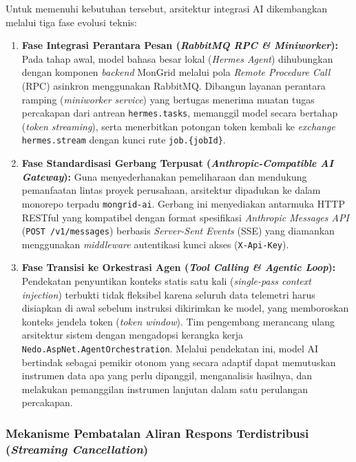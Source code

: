 Untuk memenuhi kebutuhan tersebut, arsitektur integrasi AI dikembangkan melalui tiga fase evolusi teknis:
\begin{enumerate}[label=\arabic*., leftmargin=*, itemsep=0pt]
  \item \textbf{Fase Integrasi Perantara Pesan (\textit{RabbitMQ RPC \& Miniworker}):} Pada tahap awal, model bahasa besar lokal (\textit{Hermes Agent}) dihubungkan dengan komponen \textit{backend} MonGrid melalui pola \textit{Remote Procedure Call} (RPC) asinkron menggunakan RabbitMQ. Dibangun layanan perantara ramping (\textit{miniworker service}) yang bertugas menerima muatan tugas percakapan dari antrean \texttt{hermes.tasks}, memanggil model secara bertahap (\textit{token streaming}), serta menerbitkan potongan token kembali ke \textit{exchange} \texttt{hermes.stream} dengan kunci rute \texttt{job.\{jobId\}}.
  \item \textbf{Fase Standardisasi Gerbang Terpusat (\textit{Anthropic-Compatible AI Gateway}):} Guna menyederhanakan pemeliharaan dan mendukung pemanfaatan lintas proyek perusahaan, arsitektur dipadukan ke dalam monorepo terpadu \texttt{mongrid-ai}. Gerbang ini menyediakan antarmuka HTTP RESTful yang kompatibel dengan format spesifikasi \textit{Anthropic Messages API} (\texttt{POST /v1/messages}) berbasis \textit{Server-Sent Events} (SSE) yang diamankan menggunakan \textit{middleware} autentikasi kunci akses (\texttt{X-Api-Key}).
  \item \textbf{Fase Transisi ke Orkestrasi Agen (\textit{Tool Calling \& Agentic Loop}):} Pendekatan penyuntikan konteks statis satu kali (\textit{single-pass context injection}) terbukti tidak fleksibel karena seluruh data telemetri harus disiapkan di awal sebelum instruksi dikirimkan ke model, yang memboroskan konteks jendela token (\textit{token window}). Tim pengembang merancang ulang arsitektur sistem dengan mengadopsi kerangka kerja \texttt{Nedo.AspNet.AgentOrchestration}. Melalui pendekatan ini, model AI bertindak sebagai pemikir otonom yang secara adaptif dapat memutuskan instrumen data apa yang perlu dipanggil, menganalisis hasilnya, dan melakukan pemanggilan instrumen lanjutan dalam satu perulangan percakapan.
\end{enumerate}

\subsubsection{Mekanisme Pembatalan Aliran Respons Terdistribusi (\textit{Streaming Cancellation})}


